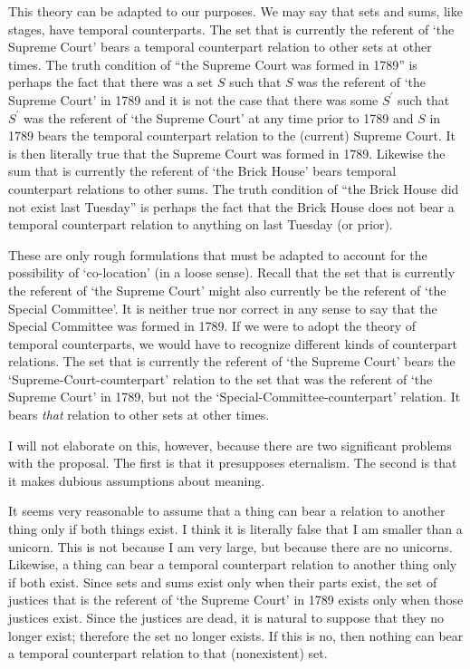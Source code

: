 \documentclass[11pt]{article}
\begin{document}
\begin{spacing}{1.5}
This theory can be adapted to our purposes.  We may say that sets and
sums, like stages, have temporal counterparts.  The set that is
currently the referent of `the Supreme Court' bears a temporal
counterpart relation to other sets at other times.  The truth
condition of ``the Supreme Court was formed in 1789'' is perhaps the
fact that there was a set $S$ such that $S$ was the referent of `the
Supreme Court' in 1789 and it is not the case that there was some
$S^{\prime}$ such that $S^{\prime}$ was the referent of `the Supreme
Court' at any time prior to 1789 and $S$ in 1789 bears the temporal
counterpart relation to the (current) Supreme Court.  It is then
literally true that the Supreme Court was formed in 1789.  Likewise
the sum that is currently the referent of `the Brick House' bears
temporal counterpart relations to other sums.  The truth condition of
``the Brick House did not exist last Tuesday'' is perhaps the fact
that the Brick House does not bear a temporal counterpart relation to
anything on last Tuesday (or prior).

These are only rough formulations that must be adapted to account for
the possibility of `co-location' (in a loose sense).  Recall that the
set that is currently the referent of `the Supreme Court' might also
currently be the referent of `the Special Committee'.  It is neither
true nor correct in any sense to say that the Special Committee was
formed in 1789.  If we were to adopt the theory of temporal
counterparts, we would have to recognize different kinds of
counterpart relations.  The set that is currently the referent of `the
Supreme Court' bears the `Supreme-Court-counterpart' relation to the
set that was the referent of `the Supreme Court' in 1789, but not the
`Special-Committee-counterpart' relation.  It bears {\em that}
relation to other sets at other times.

I will not elaborate on this, however, because there are two
significant problems with the proposal.  The first is that it
presupposes eternalism.  The second is that it makes dubious
assumptions about meaning.

It seems very reasonable to assume that a thing can bear a relation to
another thing only if both things exist.  I think it is literally
false that I am smaller than a unicorn.  This is not because I am very
large, but because there are no unicorns.  Likewise, a thing can bear
a temporal counterpart relation to another thing only if both exist.
Since sets and sums exist only when their parts exist, the set of
justices that is the referent of `the Supreme Court' in 1789 exists
only when those justices exist.  Since the justices are dead, it is
natural to suppose that they no longer exist; therefore the set no
longer exists.  If this is no, then nothing can bear a temporal
counterpart relation to that (nonexistent) set.


\end{spacing}
\end{document}
